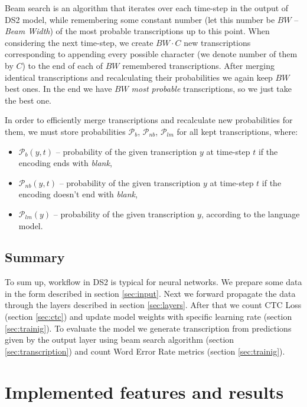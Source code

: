 \documentclass[licencjacka,en]{pracamgr}
\begin{document}
	Beam search is an algorithm that iterates over each time-step in the output of DS2 model, while remembering some constant number (let this number be $BW$ -- \textit{Beam Width}) of the most probable transcriptions up to this point. When considering the next time-step, we create $BW \cdot C$ new transcriptions corresponding to appending every possible character (we denote number of them by $C$) to the end of each of $BW$ remembered transcriptions. After merging identical transcriptions and recalculating their probabilities we again keep $BW$ best ones. In the end we have $BW$ \textit{most probable} transcriptions, so we just take the best one.
	
	In order to efficiently merge transcriptions and recalculate new probabilities for them, we must store probabilities $\mathcal{P}_{b}$, $\mathcal{P}_{nb}$, $\mathcal{P}_{lm}$ for all kept transcriptions, where:
	\begin{itemize}
		\item $\mathcal{P}_{b}(y, t)$ -- probability of the given transcription $y$ at time-step $t$ if the encoding ends with \textit{blank},
		\item $\mathcal{P}_{nb}(y, t)$ -- probability of the given transcription $y$ at time-step $t$ if the encoding doesn't end with \textit{blank},
		\item $\mathcal{P}_{lm}(y)$ -- probability of the given transcription $y$, according to the language model.\\
	\end{itemize}
	
	\section{Summary}
	To sum up, workflow in DS2 is typical for neural networks. We prepare some data in the form described in section \ref{sec:input}. Next we forward propagate the data through the layers described in section \ref{sec:layers}. After that we count CTC Loss (section \ref{sec:ctc}) and update model weights with specific learning rate (section \ref{sec:trainig}). To evaluate the model we generate transcription from predictions given by the output layer using beam search algorithm (section \ref{sec:transcription}) and count Word Error Rate metrics (section \ref{sec:trainig}).
	
	
	\chapter{Implemented features and results}\label{r:results}
	
\end{document}
